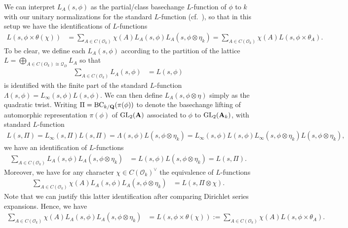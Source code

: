 \documentclass{amsart}
\theoremstyle{definition}
\theoremstyle{definition}
\theoremstyle{definition}
\begin{document}
We can interpret $L_A(s, \phi)$ as the partial/class basechange $L$-function of $\phi$ to $k$ with our unitary normalizations for 
the standard $L$-function (cf.~\cite{GZ}), so that in this setup we have the identifications of $L$-functions
\begin{align*} L(s, \phi \times \theta(\chi)) &= \sum\limits_{A \in C(\mathcal{O}_k)} \chi(A) L_A(s, \phi) L_A(s, \phi \otimes \eta_k)
=  \sum\limits_{A \in C(\mathcal{O}_k)} \chi(A) L(s, \phi \times \theta_A).\end{align*} 
To be clear, we define each $L_A(s, \phi)$ according to the partition of the lattice 
$ L = \bigoplus_{A \in C(O_k) \cong \mathcal{Q}_D} L_A$ so that 
\begin{align*} \sum\limits_{A \in C(\mathcal{O}_k)} L_A(s, \phi) &= L(s, \phi) \end{align*}
is identified with the finite part of the standard $L$-function $\Lambda(s, \phi) = L_{\infty}(s, \phi) L(s, \phi)$.
We can then define $L_A(s, \phi \otimes \eta)$ simply as the quadratic twist. 
Writing $\Pi = \operatorname{BC}_{k/{\bf{Q}}}(\pi(\phi))$ to denote the basechange lifting of automorphic representation 
$\pi(\phi)$ of $\operatorname{GL}_2({\bf{A}})$ associated to $\phi$ to $\operatorname{GL}_2({\bf{A}}_k)$, with standard $L$-function 
\begin{align*} L(s, \Pi) = L_{\infty}(s, \Pi)L(s, \Pi) = \Lambda(s, \phi) L(s, \phi \otimes \eta_k)
= L_{\infty}(s, \phi)L(s, \phi) L_{\infty}(s, \phi \otimes \eta_k) L(s, \phi \otimes \eta_k), \end{align*}
we have an identification of $L$-functions 
\begin{align*} \sum\limits_{A \in C(\mathcal{O}_k)} L_A(s, \phi) L_A(s, \phi \otimes \eta_k) &= L(s, \phi) L(s, \phi \otimes \eta_k) = L(s, \Pi).\end{align*} 
Moreover, we have for any character $\chi \in C(\mathcal{O}_k)^{\vee}$ the equivalence of $L$-functions 
\begin{align*} \sum\limits_{A \in C(\mathcal{O}_k)} \chi(A) L_A(s, \phi) L_A(s, \phi \otimes \eta_k) &= L(s, \Pi \otimes \chi) . \end{align*}
Note that we can justify this latter identification after comparing Dirichlet series expansions. Hence, we have 
\begin{equation*}\begin{aligned} \sum\limits_{A \in C(\mathcal{O}_k)} \chi(A) L_A(s, \phi) L_A(s, \phi \otimes \eta_k) 
&= L(s, \phi \times \theta(\chi)) := \sum\limits_{A \in C(\mathcal{O}_k)} \chi(A) L(s, \phi \times \theta_A). \end{aligned}\end{equation*}
\end{document}
